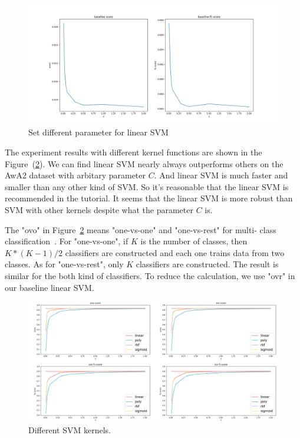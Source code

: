 \documentclass{article}
\begin{document}
\begin{figure}
	\label{fig:lSVM}
	\caption{Set different parameter for linear SVM}
	\includegraphics[width=\linewidth]{figs/baseline.png}
\end{figure}

The experiment results with different kernel functions are shown in the Figure~(\ref{fig:SVM}). We can find linear SVM nearly always outperforms others on the AwA2 dataset with arbitary parameter $C$. And linear SVM is much faster and smaller than any other kind of SVM. So it's reasonable that the linear SVM is recommended in the tutorial. It seems that the linear SVM is more robust than SVM with other kernels despite what the parameter $C$ is.

The "ovo" in Figure~\ref{fig:SVM} means "one-vs-one" and "one-vs-rest" for multi- class classification~\cite{ovo}. For "one-vs-one", if $K$ is the number of classes, then $K * (K - 1) / 2$ classifiers are constructed and each one trains data from two classes. As for "one-vs-rest", only $K$ classifiers are constructed. The result is similar for the both kind of classifiers. To reduce the calculation, we use "ovr" in our baseline linear SVM.

\begin{figure}
	\label{fig:SVM}
	\caption{Different SVM kernels.}
	\includegraphics[width=\linewidth]{figs/compare.png}
\end{figure}
\end{document}
